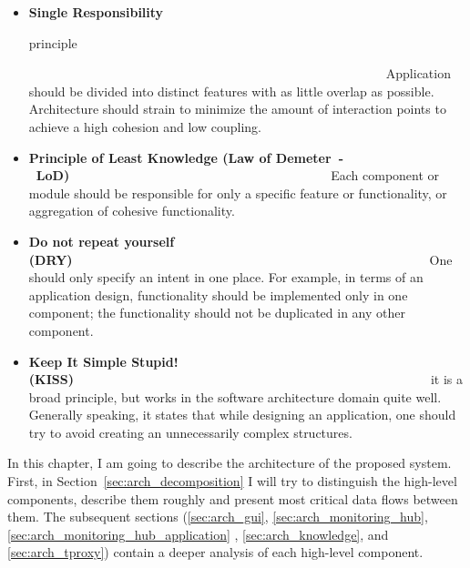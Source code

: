 \begin{itemize}

\item {\bf Single Responsibility

principle}~~~~~~~~~~~~~~~~~~~~~~~~~~~~~~~~~~~~~~~~~~~~~~~~~~~~~~~~\linebreak Application should be divided into distinct features with as little overlap as possible. Architecture should strain to minimize the amount of interaction points to achieve a high cohesion and low coupling.

\item {\bf Principle of Least Knowledge (Law of Demeter~-~LoD)}~~~~~~~~~~~~~~~~~~~~~~~~~~~~~~~~~~~~~~~~~\linebreak Each component or module should be responsible for only a specific feature or functionality, or aggregation of cohesive functionality.

\item {\bf Do not repeat yourself (DRY)}~~~~~~~~~~~~~~~~~~~~~~~~~~~~~~~~~~~~~~~~~~~~~~~~~~~~~~~~\linebreak One should only specify an intent in one place. For example, in terms of an application design, functionality should be implemented only in one component; the functionality should not be duplicated in any other component.

\item {\bf Keep It Simple Stupid! (KISS)}~~~~~~~~~~~~~~~~~~~~~~~~~~~~~~~~~~~~~~~~~~~~~~~~~~~~~~~~\linebreak it is a broad principle, but works in the software architecture domain quite well. Generally speaking, it states that while designing an application, one should try to avoid creating an unnecessarily complex structures.
\end{itemize}

In this chapter, I am going to describe the architecture of the proposed system. First, in Section~\ref{sec:arch_decomposition} I will try to distinguish the high-level components, describe them roughly and present most critical data flows between them. The subsequent sections (\ref{sec:arch_gui}, \ref{sec:arch_monitoring_hub}, \ref{sec:arch_monitoring_hub_application} , \ref{sec:arch_knowledge}, and \ref{sec:arch_tproxy}) contain a deeper analysis of each high-level component.













